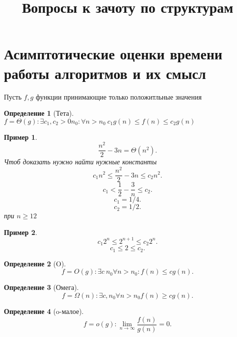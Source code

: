 \documentclass[14pt]{extarticle}
\title{Вопросы к зачоту по структурам}
\author{}
\date{}
\newtheorem{definition}{Определение}
\newtheorem{example}{Пример}[definition] \newtheorem{corollary}{Следствие}[theorem] \newtheorem{exmp}{Пример}[theorem]
\begin{document}
    \maketitle
    \section{Асимптотические оценки времени работы алгоритмов и их смысл}
    Пусть $f,g$ функции принимающие только положитльные значения
    \begin{definition}[Тета]
        $f = \Theta(g) : \exists c_1,c_2 > 0  n_0 : \forall  n > n_0 ~ c_1 g(n) \le f(n) \le  c_2 g(n)$ 
    \end{definition}
    \begin{example}
        \[
        \frac{n^2}{2} - 3n = \Theta(n^2)
        .\] 
        Чтоб доказать нужно найти нужные константы
        \[
        c_1 n^2 \le  \frac{n^2}{2} - 3n \le c_2 n^2
        .\] 
        \[
        c_1 < \frac{1}{2} - \frac{3}{n} \le  c_2 
        .\] 
        \[
        c_1 = 1/4
        .\] 
        \[
        c_2 = 1/2
        .\] 
        при $n \ge  12$
    \end{example}
    \begin{example}
        \[
        c_1 2^{n} \le 2^{n + 1} \le  c_2 2^{n}
        .\] 
        \[
        c_1 \le  2 \le  c_2
        .\] 
    \end{example}
    \begin{definition}[O]
        \[
        f = O(g) : \exists  c ~n_0 \forall  n > n_0: f(n) \le  c g(n)
        .\] 
    \end{definition}
    \begin{definition}[Омега]
        \[
        f =  \Omega(n) : \exists  c, n_0 \forall  n > n_0 f(n) \ge  cg(n)
        .\] 
    \end{definition}
    \begin{definition}[o-малое]
        \[
        f = o(g) : \lim_{n \to \infty} \frac{f(n)}{g(n)} = 0
        .\] 
    \end{definition}
\end{document}
